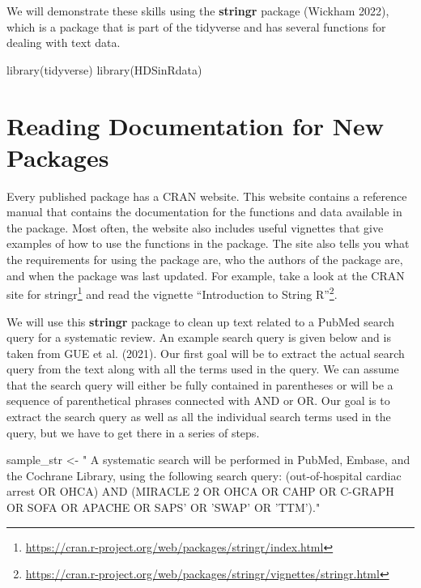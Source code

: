 \documentclass[
  letterpaper,
]{krantz}
\makeatletter
\newenvironment{Shaded}{\begin{snugshade}}{\end{snugshade}}
\newcommand{\FunctionTok}[1]{\textcolor[rgb]{0.28,0.35,0.67}{#1}}
\newcommand{\NormalTok}[1]{\textcolor[rgb]{0.00,0.23,0.31}{#1}}
\newcommand{\OtherTok}[1]{\textcolor[rgb]{0.00,0.23,0.31}{#1}}
\newcommand{\StringTok}[1]{\textcolor[rgb]{0.13,0.47,0.30}{#1}}
\renewcommand{\href}[2]{#2\footnote{\url{#1}}}
\newenvironment{kframe}{%
\medskip{}
\setlength{\fboxsep}{.8em}
 \def\at@end@of@kframe{}%
 \ifinner\ifhmode%
  \def\at@end@of@kframe{\end{minipage}}%
  \begin{minipage}{\columnwidth}%
 \fi\fi%
 \def\FrameCommand##1{\hskip\@totalleftmargin \hskip-\fboxsep
 \colorbox{shadecolor}{##1}\hskip-\fboxsep
     \hskip-\linewidth \hskip-\@totalleftmargin \hskip\columnwidth}%
 \MakeFramed {\advance\hsize-\width
   \@totalleftmargin\z@ \linewidth\hsize
   \@setminipage}}%
 {\par\unskip\endMakeFramed%
 \at@end@of@kframe}
\renewenvironment{Shaded}{\begin{kframe}}{\end{kframe}}
\makeatother
\begin{document}
We will demonstrate these skills using the \textbf{stringr} package
(Wickham 2022), which is a package that is part of the tidyverse and has
several functions for dealing with text data.

\begin{Shaded}
\begin{Highlighting}[]
\FunctionTok{library}\NormalTok{(tidyverse)}
\FunctionTok{library}\NormalTok{(HDSinRdata)}
\end{Highlighting}
\end{Shaded}

\hypertarget{reading-documentation-for-new-packages}{%
\section{Reading Documentation for New
Packages}\label{reading-documentation-for-new-packages}}

Every published package has a CRAN website. This website contains a
reference manual that contains the documentation for the functions and
data available in the package. Most often, the website also includes
useful vignettes that give examples of how to use the functions in the
package. The site also tells you what the requirements for using the
package are, who the authors of the package are, and when the package
was last updated. For example, take a look at the CRAN site for
\href{https://cran.r-project.org/web/packages/stringr/index.html}{stringr}
and read the vignette
\href{https://cran.r-project.org/web/packages/stringr/vignettes/stringr.html}{``Introduction
to String R''}.

We will use this \textbf{stringr} package to clean up text related to a
PubMed search query for a systematic review. An example search query is
given below and is taken from GUE et al. (2021). Our first goal will be
to extract the actual search query from the text along with all the
terms used in the query. We can assume that the search query will either
be fully contained in parentheses or will be a sequence of parenthetical
phrases connected with AND or OR. Our goal is to extract the search
query as well as all the individual search terms used in the query, but
we have to get there in a series of steps.

\begin{Shaded}
\begin{Highlighting}[]
\NormalTok{sample\_str }\OtherTok{\textless{}{-}} \StringTok{" A systematic search will be performed in PubMed, Embase, and the }
\StringTok{Cochrane Library, using the following search query:   (\textquotesingle{}out{-}of{-}hospital cardiac }
\StringTok{arrest\textquotesingle{} OR \textquotesingle{}OHCA\textquotesingle{}) AND (\textquotesingle{}MIRACLE 2\textquotesingle{} OR \textquotesingle{}OHCA\textquotesingle{} OR \textquotesingle{}CAHP\textquotesingle{} OR \textquotesingle{}C{-}GRAPH\textquotesingle{} OR \textquotesingle{}SOFA\textquotesingle{} }
\StringTok{OR \textquotesingle{}APACHE\textquotesingle{} OR \textquotesingle{}SAPS’ OR ’SWAP’ OR ’TTM’)."}
\end{Highlighting}
\end{Shaded}
\end{document}
